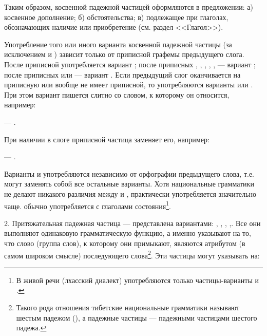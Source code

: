 Таким образом, косвенной падежной частицей оформляются в предложении: а) косвенное дополнение; б) обстоятельства; в) подлежащее при глаголах, обозначающих наличие или приобретение (см. раздел <<Глагол>>).

Употребление того или иного варианта косвенной падежной частицы (за исключением  и ) зависит только от приписной графемы предыдущего слога. После приписной  употребляется вариант ; после приписных , , , , ,  --- вариант  ; после приписных  или  --- вариант . Если предыдущий слог оканчивается на приписную  или вообще не имеет приписной, то употребляются варианты  или . При этом вариант  пишется слитно со словом, к которому он относится, например:
\begin{prfsample}
	\item {} --- .	
\end{prfsample}
При наличии в слоге приписной  частица  заменяет его, например:
\begin{prfsample}
	\item {} --- .
\end{prfsample}

Варианты  и  употребляются независимо от орфографии предыдущего слова, т.е. могут заменять собой все остальные варианты. Хотя национальные грамматики не делают никакого различия между  и , практически  употребляется значительно чаще.  обычно употребляется с глаголами состояния\footnote[45]{В живой речи (лхасский диалект) употребляются только частицы-варианты  и .}.

\label{04_06_ppch}2. Притяжательная падежная частица --- представлена вариантами: , , , ,. Все они выполняют одинаковую грамматическую функцию, а именно указывают на то, что слово (группа слов), к которому они примыкают, являются атрибутом (в самом широком смысле) последующего слова\footnote[46]{Такого рода отношения тибетские национальные грамматики называют шестым падежом (), а падежные частицы --- падежными частицами шестого падежа.}.
Эти частицы могут указывать на:

